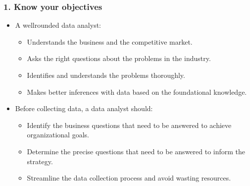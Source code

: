 \documentclass[letterpaper,10pt,english]{jupyterBook}
\begin{document}
\subsubsection{1. Know your objectives}
\label{\detokenize{1_Decision_making/Decision_making:know-your-objectives}}\begin{itemize}
\item {} 
\sphinxAtStartPar
A well\sphinxhyphen{}rounded data analyst:
\begin{itemize}
\item {} 
\sphinxAtStartPar
Understands the business and the competitive market.

\item {} 
\sphinxAtStartPar
Asks the right questions about the problems in the industry.

\item {} 
\sphinxAtStartPar
Identifies and understands the problems thoroughly.

\item {} 
\sphinxAtStartPar
Makes better inferences with data based on the foundational knowledge.

\end{itemize}

\item {} 
\sphinxAtStartPar
Before collecting data, a data analyst should:
\begin{itemize}
\item {} 
\sphinxAtStartPar
Identify the business questions that need to be answered to achieve organizational goals.

\item {} 
\sphinxAtStartPar
Determine the precise questions that need to be answered to inform the strategy.

\item {} 
\sphinxAtStartPar
Streamline the data collection process and avoid wasting resources.

\end{itemize}

\end{itemize}
\end{document}
